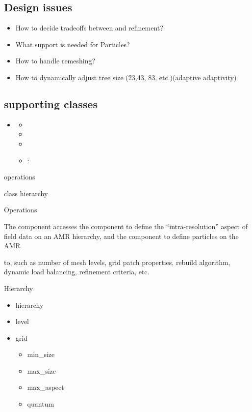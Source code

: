 \subsection{Design issues}

\begin{itemize}
    \item How to decide tradeoffs between  and 
      refinement?
    \item What support is needed for Particles?
    \item How to handle remeshing?
    \item How to dynamically adjust tree size (23,43, 83,
      etc.)(adaptive adaptivity)
\end{itemize}

\subsection{ supporting classes}

\begin{itemize}
    \item {}
    \begin{itemize}
          \item {}
          \item {}
          \item {}
          \item {}: 
    \end{itemize}
\end{itemize}

 operations

 class hierarchy

Operations

The  component accesses the  component to define
the ``intra-resolution'' aspect of field data on an AMR hierarchy, and
the
 component to define particles on the AMR

to, such as number of mesh
levels, grid patch properties, rebuild algorithm, dynamic load
balancing, refinement criteria, etc.

Hierarchy


\begin{itemize}
\item hierarchy
\item level
\item grid
\begin{itemize}
\item min\_size
\item max\_size
\item max\_aspect
\item quantum
\end{itemize}
\end{itemize}

